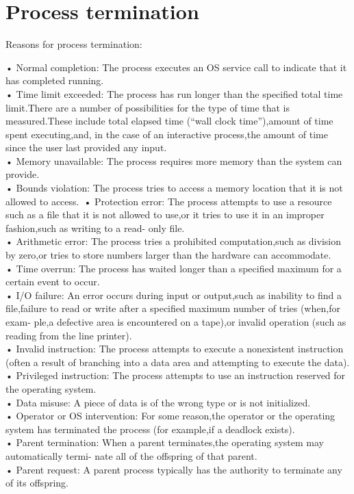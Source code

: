 \section{Process termination}

Reasons for process termination:\

• Normal completion: The process executes an OS service call to indicate that it has completed
running.\\
• Time limit exceeded: The process has run longer than the specified total time limit.There are a
number of possibilities for the type of time that is measured.These include
total elapsed time (“wall clock time”),amount of time spent executing,and,
in the case of an interactive process,the amount of time since the user last
provided any input.\\
• Memory unavailable: The process requires more memory than the system can provide.\\
• Bounds violation: The process tries to access a memory location that it is not allowed to access.\
• Protection error: The process attempts to use a resource such as a file that it is not allowed
to use,or it tries to use it in an improper fashion,such as writing to a read-
only file.\\
• Arithmetic error: The process tries a prohibited computation,such as division by zero,or tries
to store numbers larger than the hardware can accommodate.\\
• Time overrun: The process has waited longer than a specified maximum for a certain event
to occur.\\
• I/O failure: An error occurs during input or output,such as inability to find a file,failure
to read or write after a specified maximum number of tries (when,for exam-
ple,a defective area is encountered on a tape),or invalid operation (such as
reading from the line printer).\\
• Invalid instruction: The process attempts to execute a nonexistent instruction (often a result of
branching into a data area and attempting to execute the data).\\
• Privileged instruction: The process attempts to use an instruction reserved for the operating system.\\
• Data misuse: A piece of data is of the wrong type or is not initialized.\\
• Operator or OS intervention: For some reason,the operator or the operating system has terminated the
process (for example,if a deadlock exists).\\
• Parent termination: When a parent terminates,the operating system may automatically termi-
nate all of the offspring of that parent.\\
• Parent request: A parent process typically has the authority to terminate any of its offspring.\\



